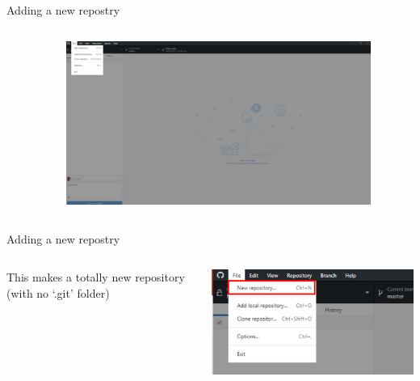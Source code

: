 \documentclass[10pt]{beamer}
\begin{document}
\begin{frame}[fragile]{Adding a new repostry}
  \begin{columns}[T]
    \begin{column}{.12\textwidth}
    \end{column}
    \begin{column}{.88\textwidth}
	\includegraphics[width=10cm]{Figs/GHD/outline_01}
    \end{column}
  \end{columns}
\end{frame}


\begin{frame}[fragile]{Adding a new repostry}
  \begin{columns}[T]
    \begin{column}{.12\textwidth}
	\small This makes a totally new repository (with no `.git' folder)
    \end{column}
    \begin{column}{.88\textwidth}
	\includegraphics[width=10cm]{Figs/GHD/menu_02}
    \end{column}
  \end{columns}
\end{frame}
\end{document}
